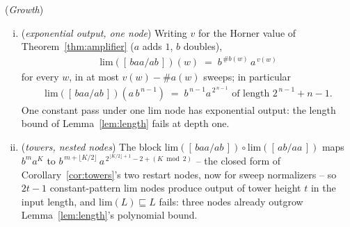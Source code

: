 \begin{proposition}
    (\emph{Growth})
    \label{prop:limgrowth}
    \begin{enumerate}[(i)]
        \item (\emph{exponential output, one node}) Writing $v$ for the
        Horner value of Theorem~\ref{thm:amplifier} ($a$ adds $1$, $b$
        doubles),
        \begin{align}
            \mathrm{lim}([\,baa/ab\,])(w) \;=\; b^{\,\#b(w)}\, a^{\,v(w)}
        \end{align}
        for every $w$, in at most $v(w) - \#a(w)$ sweeps; in particular
        \begin{align}
            \mathrm{lim}([\,baa/ab\,])(a\,b^{\,n-1}) \;=\;
            b^{\,n-1} a^{\,2^{\,n-1}} \text{ of length } 2^{\,n-1} + n - 1 .
        \end{align}
        One constant pass under one $\mathrm{lim}$ node has exponential
        output: the length bound of Lemma~\ref{lem:length} fails at
        depth one.
        \item (\emph{towers, nested nodes}) The block
        $\mathrm{lim}([\,baa/ab\,]) \circ \mathrm{lim}([\,ab/aa\,])$
        maps $b^{m} a^{K}$ to
        $b^{\,m + \lfloor K/2 \rfloor}\,
        a^{\,2^{\lfloor K/2 \rfloor + 1} - 2 + (K \bmod 2)}$ -- the
        closed form of Corollary~\ref{cor:towers}'s two restart nodes,
        now for sweep normalizers -- so $2t - 1$ constant-pattern
        $\mathrm{lim}$ nodes produce output of tower height $t$ in the
        input length, and $\mathrm{lim}(L) \sqsubseteq L$ fails: three
        nodes already outgrow Lemma~\ref{lem:length}'s polynomial
        bound.
    \end{enumerate}
\end{proposition}

